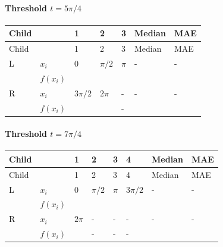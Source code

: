 \documentclass[10pt]{article}
\begin{document}
\paragraph*{Threshold $t=5\pi/4$}
\begingroup
\small
\setlength{\tabcolsep}{4pt}
\begin{longtable}{l|l|l|l|l|l|l}
Child &  & 1 & 2 & 3 & Median & MAE \\
\hline
\endfirsthead
Child &  & 1 & 2 & 3 & Median & MAE \\
\hline
\endhead
L & $x_i$ & $0$ & $\pi/2$ & $\pi$ & - & - \\[3pt]
 & $f(x_i)$ & $\phantom{0}$ & $\phantom{0}$ & $\phantom{0}$ & $\phantom{0}$ & $\phantom{0}$ \\[3pt]
R & $x_i$ & $3\pi/2$ & $2\pi$ & - & - & - \\[3pt]
 & $f(x_i)$ & $\phantom{0}$ & $\phantom{0}$ & - & $\phantom{0}$ & $\phantom{0}$ \\[3pt]
\end{longtable}
\endgroup
\paragraph*{Threshold $t=7\pi/4$}
\begingroup
\small
\setlength{\tabcolsep}{4pt}
\begin{longtable}{l|l|l|l|l|l|l|l}
Child &  & 1 & 2 & 3 & 4 & Median & MAE \\
\hline
\endfirsthead
Child &  & 1 & 2 & 3 & 4 & Median & MAE \\
\hline
\endhead
L & $x_i$ & $0$ & $\pi/2$ & $\pi$ & $3\pi/2$ & - & - \\[3pt]
 & $f(x_i)$ & $\phantom{0}$ & $\phantom{0}$ & $\phantom{0}$ & $\phantom{0}$ & $\phantom{0}$ & $\phantom{0}$ \\[3pt]
R & $x_i$ & $2\pi$ & - & - & - & - & - \\[3pt]
 & $f(x_i)$ & $\phantom{0}$ & - & - & - & $\phantom{0}$ & $\phantom{0}$ \\[3pt]
\end{longtable}
\endgroup
\end{document}

